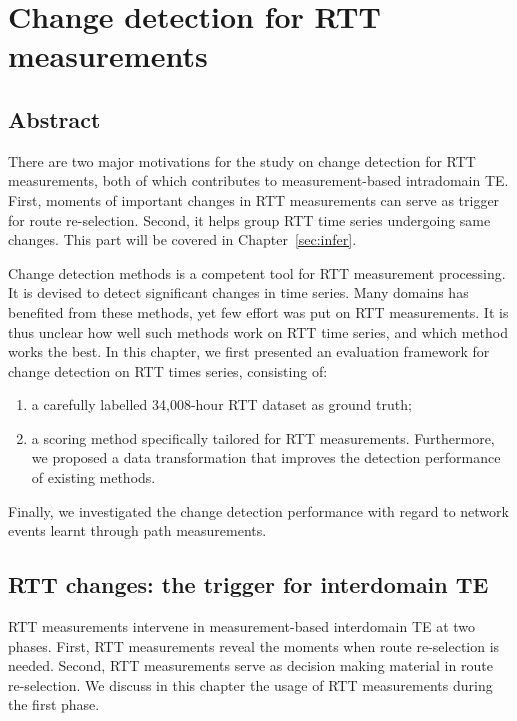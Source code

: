 \chapter{Change detection for RTT measurements}
\label{sec:cpt_rtt}

\section*{Abstract}
There are two major motivations for the study on change detection for \ac{RTT} measurements, both of which contributes to measurement-based intradomain \ac{TE}.
First, moments of important changes in RTT measurements can serve as trigger for route re-selection.
Second, it helps group RTT time series undergoing same changes.
This part will be covered in Chapter~\ref{sec:infer}.


Change detection methods is a competent tool for RTT measurement processing.
It is devised to detect significant changes in time series.
Many domains has benefited from these methods, yet few effort was put on RTT measurements. 
It is thus unclear how well such methods work on RTT time series, and which method works the best. 
In this chapter, we first presented an evaluation framework for change detection on RTT times series, consisting of:
\begin{enumerate}
	\item a carefully labelled 34,008-hour RTT dataset as ground truth;
	\item a scoring method specifically tailored for RTT measurements.
Furthermore, we proposed a data transformation that improves the detection performance of existing methods.
\end{enumerate}
Finally, we investigated the change detection performance with regard to network events learnt through path measurements.
\clearpage


\section{RTT changes: the trigger for interdomain TE}
RTT measurements intervene in measurement-based interdomain TE at two phases. 
First, RTT measurements reveal the moments when route re-selection is needed. %
Second, RTT measurements serve as decision making material in route re-selection. %
We discuss in this chapter the usage of RTT measurements during the first phase.

